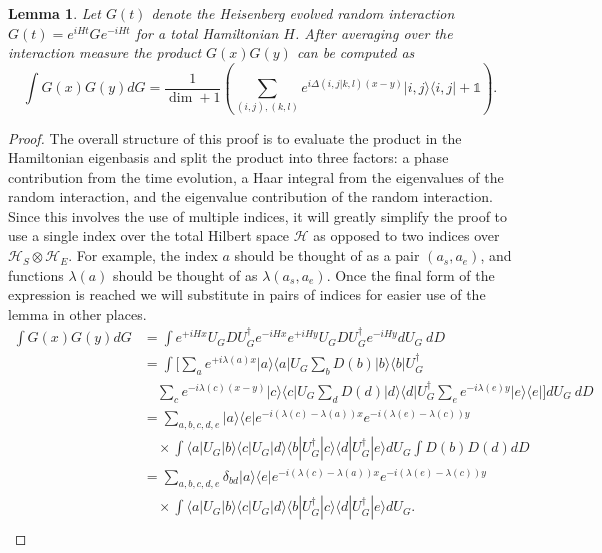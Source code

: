 \documentclass{article}
\newtheorem{lemma}[theorem]{Lemma}
\newcommand{\ket}[1]{|#1\rangle}
\newcommand{\bra}[1]{\langle #1|}
\newcommand{\ketbra}[2]{| #1\rangle\! \langle #2|}
\newcommand{\parens}[1]{\left( #1 \right)}
\newcommand{\hilb}{\mathcal{H}}
\newcommand{\identity}{\mathds{1}}
\begin{document}
\begin{lemma} \label{lem:two_heisenberg_interactions}
    Let $G(t)$ denote the Heisenberg evolved random interaction $G(t) = e^{iHt} G e^{-iHt}$ for a total Hamiltonian $H$. After averaging over the interaction measure the product $G(x) G(y)$ can be computed as
    \begin{equation}
        \int G(x) G(y) dG = \frac{1}{\dim + 1} \parens{\sum_{(i,j),(k,l)} e^{i \Delta(i,j|k,l) (x-y)} \ketbra{i,j}{i,j} + \identity}.
    \end{equation}
\end{lemma}
\begin{proof}
The overall structure of this proof is to evaluate the product in the Hamiltonian eigenbasis and split the product into three factors: a phase contribution from the time evolution, a Haar integral from the eigenvalues of the random interaction, and the eigenvalue contribution of the random interaction. Since this involves the use of multiple indices, it will greatly simplify the proof to use a single index over the total Hilbert space $\hilb$ as opposed to two indices over $\hilb_S \otimes \hilb_E$. For example, the index $a$ should be thought of as a pair $(a_s, a_e)$, and functions $\lambda(a)$ should be thought of as $\lambda(a_s, a_e)$. Once the final form of the expression is reached we will substitute in pairs of indices for easier use of the lemma in other places.
    \begin{align}
        \int G(x) G(y) dG &= \int e^{+i H x} U_G D U_G^\dagger e^{-i H x} e^{+i H y} U_G D U_G^\dagger e^{-i H y} dU_G ~dD \\
        &= \int \bigg[\sum_a e^{+i \lambda(a)x}\ketbra{a}{a}  U_G \sum_b D(b)\ketbra{b}{b} U_G^\dagger \nonumber \\
        &\quad \sum_c e^{-i \lambda(c) (x - y)} \ketbra{c}{c} U_G \sum_d D(d)\ketbra{d}{d} U_G^\dagger \sum_e e^{-i \lambda(e) y} \ketbra{e}{e} \bigg] dU_G ~dD\\
        &=\sum_{a,b,c,d,e} \ketbra{a}{e} e^{-i (\lambda(c) - \lambda(a))x} e^{-i (\lambda(e) - \lambda(c))y} \nonumber \\
        &\quad \times \int \bra{a} U_G \ket{b} \bra{c} U_G \ket{d} \bra{b} U_G^{\dagger} \ket{c} \bra{d} U_G^\dagger \ket{e} dU_G \int D(b) D(d) dD \\
        &=  \sum_{a, b, c, d, e} \delta_{bd} \ketbra{a}{e} e^{-i (\lambda(c) - \lambda(a))x} e^{-i (\lambda(e) - \lambda(c))y} \nonumber \\
        &\quad \times \int \bra{a} U_G \ket{b} \bra{c} U_G \ket{d} \bra{b} U_G^{\dagger} \ket{c} \bra{d} U_G^\dagger \ket{e} dU_G. \\

\end{align}
\end{proof}
\end{document}
